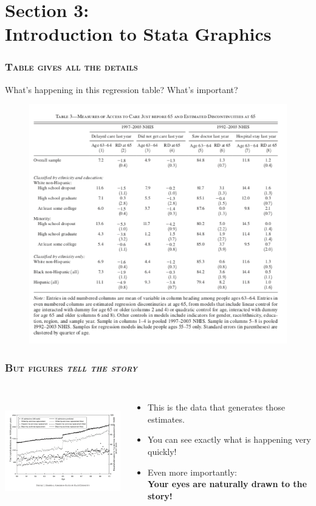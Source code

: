 \documentclass[10pt]{beamer}
\begin{document}
	\section{Section 3: \\ Introduction to Stata Graphics}	
	
	\begin{frame}
	\frametitle{\textsc{Table gives all the details}}
		\begin{center}
		What's happening in this regression table? What's important?
		\begin{figure}
			\includegraphics[width=0.7\linewidth]{reg_table_example}
		\end{figure}		
		\end{center}
	\end{frame}

	\begin{frame}
	\frametitle{\textsc{But figures \textit{tell the story}}}
		\begin{columns}
			\includegraphics[height=5cm, width=6cm]{figure_example_1}
			\hspace{5mm}
			\begin{itemize}
				\item This is the data that generates those estimates.
				\item You can see exactly what is happening very quickly!
				\item Even more importantly: \\ \textbf{Your eyes are naturally drawn to the story!}
			\end{itemize}
		\end{columns} 
	\end{frame}
\end{document}

